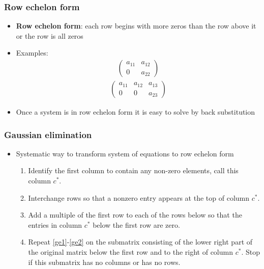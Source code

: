 \documentclass[compress]{beamer}
\theoremstyle{definition}
\begin{document}
\begin{frame}
  \frametitle{Row echelon form}
  \begin{itemize}
  \item \textbf{Row echelon form}: each row begins with more zeros
    than the row above it or the row is all zeros
  \item Examples: 
    \begin{align*}
      \begin{pmatrix} 
        a_{11} & a_{12} \\
        0     & a_{22}
      \end{pmatrix}
    \end{align*}
    \begin{align*}
      \begin{pmatrix}
        a_{11} & a_{12} & a_{13} \\
        0     & 0     & a_{23} 
      \end{pmatrix}
    \end{align*}
  \item Once a system is in row echelon form it is easy to solve by
    back substitution
  \end{itemize}
\end{frame}

\begin{frame}
  \frametitle{Gaussian elimination}
  \begin{itemize}
  \item Systematic way to transform system of equations to row echelon
    form
    \begin{enumerate}
    \item\label{ge1} Identify the first column to contain any non-zero
      elements, call this column $c^*$.
    \item\label{ge2} Interchange rows so that a nonzero entry appears at
      the top of column $c^*$. 
    \item\label{ge3} Add a multiple of the first row to each of the rows
      below so that the entries in column $c^*$ below the first row are
      zero.
    \item\label{ge4} Repeat \ref{ge1}-\ref{ge2} on the submatrix
      consisting of the lower right part of the original matrix below the
      first row and to the right of column $c^*$. Stop if this submatrix
      has no columns or has no rows.
    \end{enumerate}
  \end{itemize}
\end{frame}
\end{document}
